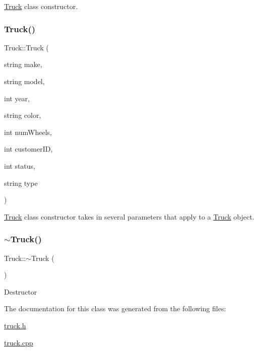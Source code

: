 \hyperlink{class_truck}{Truck} class constructor. \mbox{\label{class_truck_a134acf4a22664f65be38ba2843b2ae18}} 
\subsubsection{\texorpdfstring{Truck()}{Truck()}\hspace{0.1cm}{\footnotesize\ttfamily [2/2]}}
{\footnotesize\ttfamily Truck\+::\+Truck (\begin{DoxyParamCaption}\item[{string}]{make,  }\item[{string}]{model,  }\item[{int}]{year,  }\item[{string}]{color,  }\item[{int}]{num\+Wheels,  }\item[{int}]{customer\+ID,  }\item[{int}]{status,  }\item[{string}]{type }\end{DoxyParamCaption})}

\hyperlink{class_truck}{Truck} class constructor takes in several parameters that apply to a \hyperlink{class_truck}{Truck} object. \mbox{\label{class_truck_afe887186d0490451a8ce4a3ef433dee3}} 
\subsubsection{\texorpdfstring{$\sim$\+Truck()}{~Truck()}}
{\footnotesize\ttfamily Truck\+::$\sim$\+Truck (\begin{DoxyParamCaption}{ }\end{DoxyParamCaption})}

Destructor 

The documentation for this class was generated from the following files\+:\begin{DoxyCompactItemize}
\item 
\hyperlink{truck_8h}{truck.\+h}\item 
\hyperlink{truck_8cpp}{truck.\+cpp}\end{DoxyCompactItemize}
